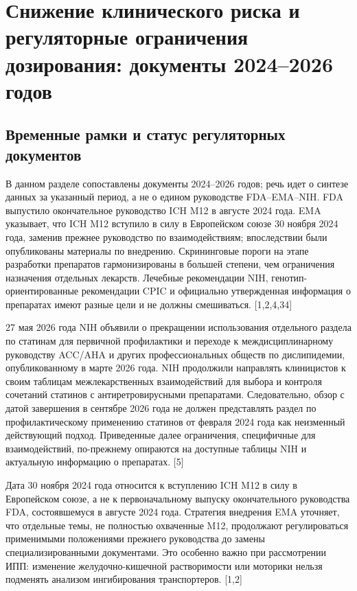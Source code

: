 \documentclass[11pt]{article}
\begin{document}
\section{Снижение клинического риска и регуляторные ограничения дозирования: документы 2024--2026 годов}

\subsection{Временные рамки и статус регуляторных документов}

В данном разделе сопоставлены документы 2024--2026 годов; речь идет о синтезе данных за указанный период, а не о едином руководстве FDA--EMA--NIH. FDA выпустило окончательное руководство ICH M12 в августе 2024 года. EMA указывает, что ICH M12 вступило в силу в Европейском союзе 30 ноября 2024 года, заменив прежнее руководство по взаимодействиям; впоследствии были опубликованы материалы по внедрению. Скрининговые пороги на этапе разработки препаратов гармонизированы в большей степени, чем ограничения назначения отдельных лекарств. Лечебные рекомендации NIH, генотип-ориентированные рекомендации CPIC и официально утвержденная информация о препаратах имеют разные цели и не должны смешиваться. [1,2,4,34]

27 мая 2026 года NIH объявили о прекращении использования отдельного раздела по статинам для первичной профилактики и переходе к междисциплинарному руководству ACC/AHA и других профессиональных обществ по дислипидемии, опубликованному в марте 2026 года. NIH продолжили направлять клиницистов к своим таблицам межлекарственных взаимодействий для выбора и контроля сочетаний статинов с антиретровирусными препаратами. Следовательно, обзор с датой завершения в сентябре 2026 года не должен представлять раздел по профилактическому применению статинов от февраля 2024 года как неизменный действующий подход. Приведенные далее ограничения, специфичные для взаимодействий, по-прежнему опираются на доступные таблицы NIH и актуальную информацию о препаратах. [5]

Дата 30 ноября 2024 года относится к вступлению ICH M12 в силу в Европейском союзе, а не к первоначальному выпуску окончательного руководства FDA, состоявшемуся в августе 2024 года. Стратегия внедрения EMA уточняет, что отдельные темы, не полностью охваченные M12, продолжают регулироваться применимыми положениями прежнего руководства до замены специализированными документами. Это особенно важно при рассмотрении ИПП: изменение желудочно-кишечной растворимости или моторики нельзя подменять анализом ингибирования транспортеров. [1,2]
\end{document}
